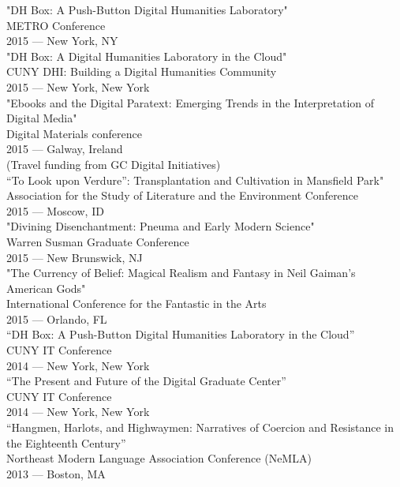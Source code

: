 \documentclass[11pt]{article}
\begin{document}
"DH Box: A Push-Button Digital Humanities Laboratory"\\[0pt]
METRO Conference\\[0pt]
2015 — New York, NY\\[0pt]

"DH Box: A Digital Humanities Laboratory in the Cloud"\\[0pt]
CUNY DHI: Building a Digital Humanities Community\\[0pt]
2015 — New York, New York\\[0pt]

"Ebooks and the Digital Paratext: Emerging Trends in the Interpretation of Digital Media"\\[0pt]
Digital Materials conference\\[0pt]
2015 — Galway, Ireland\\[0pt]
(Travel funding from GC Digital Initiatives)\\[0pt]

“To Look upon Verdure”: Transplantation and Cultivation in Mansfield Park"\\[0pt]
Association for the Study of Literature and the Environment Conference\\[0pt]
2015 — Moscow, ID\\[0pt]

"Divining Disenchantment: Pneuma and Early Modern Science"\\[0pt]
Warren Susman Graduate Conference\\[0pt]
2015 — New Brunswick, NJ\\[0pt]

"The Currency of Belief: Magical Realism and Fantasy in Neil Gaiman’s American Gods"\\[0pt]
International Conference for the Fantastic in the Arts\\[0pt]
2015 — Orlando, FL\\[0pt]

“DH Box: A Push-Button Digital Humanities Laboratory in the Cloud”\\[0pt]
CUNY IT Conference\\[0pt]
2014 — New York, New York\\[0pt]

“The Present and Future of the Digital Graduate Center”\\[0pt]
CUNY IT Conference\\[0pt]
2014 — New York, New York\\[0pt]

“Hangmen, Harlots, and Highwaymen: Narratives of Coercion and Resistance in the Eighteenth Century”\\[0pt]
Northeast Modern Language Association Conference (NeMLA)\\[0pt]
2013 — Boston, MA\\[0pt]
\end{document}
